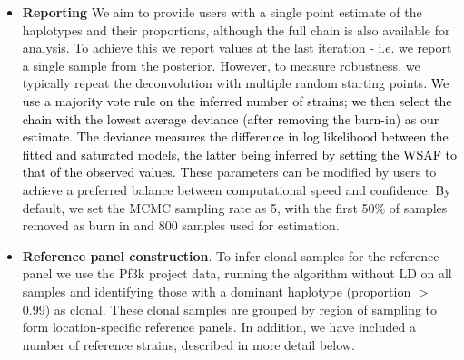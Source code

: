 \documentclass[9pt]{article}
\begin{document}
\begin{itemize}
\begin{itemize}
\item {\bf Reporting} We aim to provide users with a single point estimate of the haplotypes and their proportions, although the full chain is also available for analysis.  To achieve this we report values at the last iteration - i.e. we report a single sample from the posterior.  However, to measure robustness, we typically repeat the deconvolution with multiple random starting points\textcolor{black}{. We use a majority vote rule on the inferred number of strains; we then select the chain with the lowest average deviance (after removing the burn-in) as our estimate. The deviance measures the difference in log likelihood between the fitted and saturated models, the latter being inferred by setting the WSAF to that of the observed values.} These parameters can be modified by users to achieve a preferred balance between computational speed and confidence.  By default, we set the MCMC sampling rate as 5, with the first 50\% of samples removed as burn in and 800 samples used for estimation.

\item {\bf Reference panel construction}. To infer clonal samples for the reference panel we use the Pf3k project data, running the algorithm without LD on all samples and identifying those with a dominant haplotype (proportion $>$ 0.99) as clonal.  These clonal samples are grouped by region of sampling to form location-specific reference panels.  In addition, we have included a number of reference strains, described in more detail below.

\end{itemize}



\end{itemize}
\end{document}
